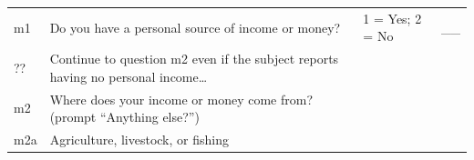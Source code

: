 \documentclass[12pt,a4paper]{book}
\theoremstyle{definition}
\theoremstyle{definition}
\theoremstyle{definition}
\theoremstyle{remark}
\begin{document}
\begin{longtable}[]{@{}llll@{}}
\toprule
\begin{minipage}[t]{0.09\columnwidth}\raggedright
m1\strut
\end{minipage} & \begin{minipage}[t]{0.41\columnwidth}\raggedright
Do you have a personal source of income or money?\strut
\end{minipage} & \begin{minipage}[t]{0.25\columnwidth}\raggedright
1 = Yes; 2 = No\strut
\end{minipage} & \begin{minipage}[t]{0.13\columnwidth}\raggedright
\textbar{}\_\_\textbar{}\strut
\end{minipage}\tabularnewline
\begin{minipage}[t]{0.09\columnwidth}\raggedright
??\strut
\end{minipage} & \begin{minipage}[t]{0.41\columnwidth}\raggedright
Continue to question m2 even if the subject reports having no personal
income\ldots{}\strut
\end{minipage} & \begin{minipage}[t]{0.25\columnwidth}\raggedright
\strut
\end{minipage} & \begin{minipage}[t]{0.13\columnwidth}\raggedright
\strut
\end{minipage}\tabularnewline
\begin{minipage}[t]{0.09\columnwidth}\raggedright
m2\strut
\end{minipage} & \begin{minipage}[t]{0.41\columnwidth}\raggedright
Where does your income or money come from? (prompt ``Anything
else?'')\strut
\end{minipage} & \begin{minipage}[t]{0.25\columnwidth}\raggedright
\strut
\end{minipage} & \begin{minipage}[t]{0.13\columnwidth}\raggedright
\strut
\end{minipage}\tabularnewline
\begin{minipage}[t]{0.09\columnwidth}\raggedright
m2a\strut
\end{minipage} & \begin{minipage}[t]{0.41\columnwidth}\raggedright
Agriculture, livestock, or fishing\strut
\end{minipage} & \begin{minipage}[t]{0.25\columnwidth}\raggedright

\end{minipage}
\end{longtable}
\end{document}
